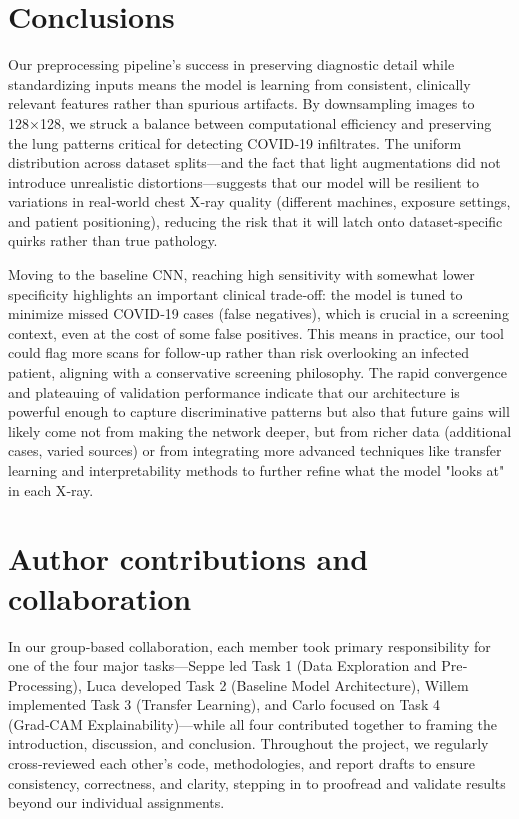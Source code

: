 \documentclass[conference]{IEEEtran}
\begin{document}
\section{Conclusions}\label{sec:conclusions}

Our preprocessing pipeline’s success in preserving diagnostic detail while standardizing inputs means the model is learning from consistent, clinically relevant features rather than spurious artifacts. By downsampling images to 128×128, we struck a balance between computational efficiency and preserving the lung patterns critical for detecting COVID‑19 infiltrates. The uniform distribution across dataset splits—and the fact that light augmentations did not introduce unrealistic distortions—suggests that our model will be resilient to variations in real‑world chest X‑ray quality (different machines, exposure settings, and patient positioning), reducing the risk that it will latch onto dataset‐specific quirks rather than true pathology.

Moving to the baseline CNN, reaching high sensitivity with somewhat lower specificity highlights an important clinical trade‑off: the model is tuned to minimize missed COVID‑19 cases (false negatives), which is crucial in a screening context, even at the cost of some false positives. This means in practice, our tool could flag more scans for follow‑up rather than risk overlooking an infected patient, aligning with a conservative screening philosophy. The rapid convergence and plateauing of validation performance indicate that our architecture is powerful enough to capture discriminative patterns but also that future gains will likely come not from making the network deeper, but from richer data (additional cases, varied sources) or from integrating more advanced techniques like transfer learning and interpretability methods to further refine what the model "looks at" in each X‑ray.

\section{Author contributions and collaboration}

In our group‐based collaboration, each member took primary responsibility for one of the four major tasks—Seppe led Task 1 (Data Exploration and Pre‐Processing), Luca developed Task 2 (Baseline Model Architecture), Willem implemented Task 3 (Transfer Learning), and Carlo focused on Task 4 (Grad‑CAM Explainability)—while all four contributed together to framing the introduction, discussion, and conclusion. Throughout the project, we regularly cross‐reviewed each other’s code, methodologies, and report drafts to ensure consistency, correctness, and clarity, stepping in to proofread and validate results beyond our individual assignments.
\end{document}
